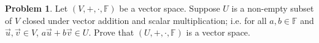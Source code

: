 \documentclass[12pt]{article}
\theoremstyle{definition}
\newtheorem{problem}{Problem}
\begin{document}
\begin{problem}
    Let $(V,+,\cdot,\mathbb{F})$ be a vector space. Suppose $U$ is a non-empty subset of $V$ closed under vector addition and scalar multiplication; i.e. for all $a,b\in\mathbb{F}$ and $\vec{u},\vec{v}\in V$, $a\vec{u} + b \vec{v} \in U$. 
    Prove that $(U,+,\cdot,\mathbb{F})$ is a vector space.
\end{problem}

\end{document}
